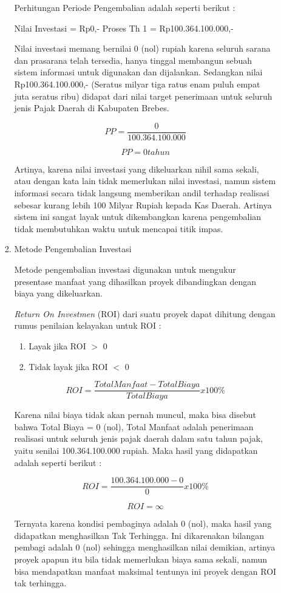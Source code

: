 \documentclass[pdftex,12pt, oneside]{article}
\begin{document}
\begin{enumerate}
\begin{enumerate}
\begin{enumerate}
Perhitungan Periode Pengembalian adalah seperti berikut :

Nilai Investasi = Rp0,-
Proses Th 1 = Rp100.364.100.000,-

Nilai investasi memang bernilai 0 (nol) rupiah karena seluruh sarana dan prasarana telah tersedia, hanya tinggal membangun sebuah sistem informasi untuk digunakan dan dijalankan. Sedangkan nilai Rp100.364.100.000,- (Seratus milyar tiga ratus enam puluh empat juta seratus ribu) didapat dari nilai target penerimaan untuk seluruh jenis Pajak Daerah di Kabupaten Brebes.

\[ PP = \frac{0}{100.364.100.000} \]

\[ PP = 0 tahun \]

Artinya, karena nilai investasi yang dikeluarkan nihil sama sekali, atau dengan kata lain tidak memerlukan nilai investasi, namun sistem informasi secara tidak langsung memberikan andil terhadap realisasi sebesar kurang lebih 100 Milyar Rupiah kepada Kas Daerah. Artinya sistem ini sangat layak untuk dikembangkan karena pengembalian tidak membutuhkan waktu untuk mencapai titik impas.

	\item Metode Pengembalian Investasi
	
Metode pengembalian investasi digunakan untuk mengukur presentase manfaat yang dihasilkan proyek dibandingkan dengan biaya yang dikeluarkan.

\textit{Return On Investmen} (ROI) dari suatu proyek dapat dihitung dengan rumus penilaian kelayakan untuk ROI :

\begin{enumerate}
	\item Layak jika ROI $>$ 0
	\item Tidak layak jika ROI $<$ 0
\end{enumerate}	

\[ ROI = \frac{Total Manfaat - Total Biaya}{Total Biaya} x 100\% \]
	
Karena nilai biaya tidak akan pernah muncul, maka bisa disebut bahwa Total Biaya = 0 (nol), Total Manfaat adalah penerimaan realisasi untuk seluruh jenis pajak daerah dalam satu tahun pajak, yaitu senilai 100.364.100.000 rupiah. Maka hasil yang didapatkan adalah seperti berikut :

\[ ROI = \frac{100.364.100.000 - 0}{0} x 100\% \]

\[ ROI = \infty \]

Ternyata karena kondisi pembaginya adalah 0 (nol), maka hasil yang didapatkan menghasilkan Tak Terhingga. Ini dikarenakan bilangan pembagi adalah 0 (nol) sehingga menghasilkan nilai demikian, artinya proyek apapun itu bila tidak memerlukan biaya sama sekali, namun bisa mendapatkan manfaat maksimal tentunya ini proyek dengan ROI tak terhingga.


\end{enumerate}
\end{enumerate}
\end{enumerate}
\end{document}
